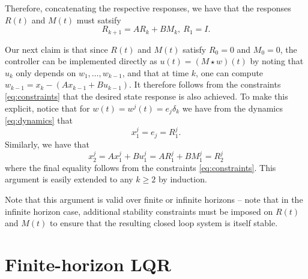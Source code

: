 \documentclass[11pt]{article}
\numberwithin{equation}{section}
\begin{document}
Therefore, concatenating the respective responses, we have that the responses $R(t)$ and $M(t)$ must satsify
\begin{equation}
R_{k+1} = AR_k + BM_k, \ R_1 = I.
\label{eq:constraints}
\end{equation}

Our next claim is that since $R(t)$ and $M(t)$ satisfy $R_0 = 0$ and $M_0=0$, the controller can be implemented directly as $u(t) = (M\star w)(t)$ by noting that $u_k$ only depends on $w_1,\dots,w_{k-1}$, and that at time $k$, one can compute $w_{k-1} = x_k - (Ax_{k-1} + Bu_{k-1})$.  It therefore follows from the constraints \eqref{eq:constraints} that the desired state response is also achieved.  To make this explicit, notice that for $w(t) = w^j(t) = e_j \delta_k$ we have from the dynamics \eqref{eq:dynamics} that
\[
x^j_1 = e_j = R^j_1.
\]
Similarly, we have that
\[
x^j_2 = Ax^j_1 + Bu^j_1 = AR^j_1 + BM^j_1 = R^j_2
\]
where the final equality follows from the constraints \eqref{eq:constraints}.  This argument is easily extended to any $k\geq 2$ by induction.

Note that this argument is valid over finite or infinite horizons -- note that in the infinite horizon case, additional stability constraints must be imposed on $R(t)$ and $M(t)$ to ensure that the resulting closed loop system is itself stable.

\section{Finite-horizon LQR}
\end{document}

